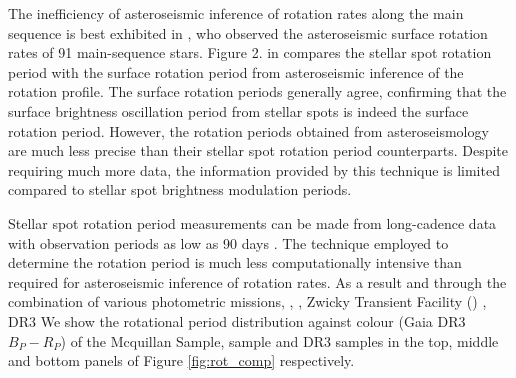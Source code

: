 The inefficiency of asteroseismic inference of rotation rates along the main sequence is best exhibited in \citet{hall_weakened_2021}, who observed the asteroseismic surface rotation rates of 91 main-sequence stars.
Figure 2. in \citet{hall_weakened_2021}compares the stellar spot rotation period with the surface rotation period from asteroseismic inference of the rotation profile.
The surface rotation periods generally agree, confirming that the surface brightness oscillation period from stellar spots is indeed the surface rotation period.
However, the rotation periods obtained from asteroseismology are much less precise than their stellar spot rotation period counterparts.
Despite requiring much more data, the information provided by this technique is limited compared to stellar spot brightness modulation periods.

Stellar spot rotation period measurements can be made from long-cadence data with observation periods as low as 90 days \citep{mcquillan_rotation_2014}.
The technique employed to determine the rotation period is much less computationally intensive than required for asteroseismic inference of rotation rates.
As a result and through the combination of various photometric missions, \kepler{} \citep{mcquillan_rotation_2014, santos_surface_2021}, \ktoo{} \citep{santos_surface_2021}, Zwicky Transient Facility (\ZTF) \citep{lu_bridging_2022}, \gaia{} DR3 \citep{distefano_gaia_2022} %
We show the rotational period distribution against colour (Gaia DR3 $B_P - R_P$) of the \kepler{} Mcquillan Sample, \ZTF{} sample and \gaia{} DR3 samples in the top, middle and bottom panels of Figure \ref{fig:rot_comp} respectively.

